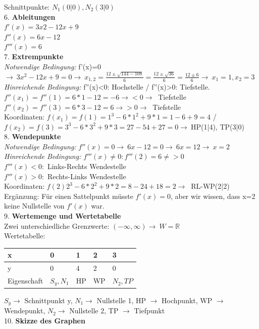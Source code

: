 \documentclass{article}
\newcommand{\R}{\mathbb{R}}
\begin{document}
	Schnittpunkte: $N_1(0|0), N_2(3|0)$ \\
	6. \textbf{Ableitungen} \\
	$f'(x)=3x2-12x+9$ \\
	$f''(x)=6x-12$ \\
	$f'''(x)=6$ \\
	7. \textbf{Extrempunkte} \\
	\textit{Notwendige Bedingung:} f'(x)=0 $\to\ 3x^2-12x+9=0\to\ x_{1,2}=\frac{12\pm\sqrt{144-108}}{6}=\frac{12\pm\sqrt{36}}{6}=\frac{12\pm6}{6}\to\ x_1=1, x_2=3$ \\
	\textit{Hinreichende Bedingung:} f''(x)<0: Hochstelle / f''(x)>0: Tiefstelle. \\
	$f''(x_1)=f''(1)=6*1-12=-6\to <0 \to\ $ Tiefstelle \\
	$f''(x_2)=f''(3)=6*3-12=6\to >0\to\ $ Tiefstelle \\
	Koordinaten: $f(x_1)=f(1)=1^3-6*1^2+9*1=1-6+9=4$ / $f(x_2)=f(3)=3^3-6*3^2+9*3=27-54+27=0 \to\ $HP(1|4), TP(3|0) \\
	8. \textbf{Wendepunkte} \\
	\textit{Notwendige Bedingung:} $f''(x)=0\to\ 6x-12=0\to\ 6x=12\to\ x=2$ \\
	\textit{Hinreichende Bedingung:} $f'''(x)\ne0:f'''(2)=6\ne>0$ \\
	$f'''(x)<0:$ Links-Rechts Wendestelle \\
	$f'''(x)>0:$ Rechts-Links Wendestelle \\
	Koordinaten: $f(2)2^3-6*2^2+9*2=8-24+18=2\to\ $ RL-WP(2|2) \\
	Ergänzung: Für einen Sattelpunkt müsste $f'(x)=0$, aber wir wissen, dass x=2 keine Nullstelle von $f'(x)$ war. \\
	9. \textbf{Wertemenge und Wertetabelle} \\
	Zwei unterschiedliche Grenzwerte: $(-\infty, \infty)\to\ W=\R$ \\
	Wertetabelle: \\
	\begin{tabular}{| l | l | l | l | l |}
		\toprule
		x & 0 & 1 & 2 & 3 \\ \hline
		y & 0 & 4 & 2 & 0\\ \hline
		Eigenschaft & $S_y, N_1$ & HP & WP & $N_2, TP$ \\
		\bottomrule
	\end{tabular}
	$S_y\to$ Schnittpunkt y, $N_1\to $ Nullstelle 1, HP $\to$ Hochpunkt, WP $\to$ Wendepunkt, $N_2\to$ Nullstelle 2, TP $\to$ Tiefpunkt \\
	10. \textbf{Skizze des Graphen}
\end{document}
